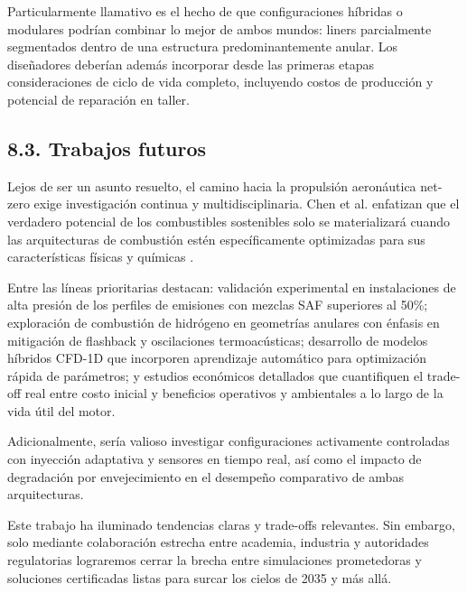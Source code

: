 Particularmente llamativo es el hecho de que configuraciones híbridas o modulares podrían combinar lo mejor de ambos mundos: liners parcialmente segmentados dentro de una estructura predominantemente anular. Los diseñadores deberían además incorporar desde las primeras etapas consideraciones de ciclo de vida completo, incluyendo costos de producción y potencial de reparación en taller.

\subsection{8.3. Trabajos futuros}

Lejos de ser un asunto resuelto, el camino hacia la propulsión aeronáutica net-zero exige investigación continua y multidisciplinaria. Chen et al. enfatizan que el verdadero potencial de los combustibles sostenibles solo se materializará cuando las arquitecturas de combustión estén específicamente optimizadas para sus características físicas y químicas \cite{Chen2025}.

Entre las líneas prioritarias destacan: validación experimental en instalaciones de alta presión de los perfiles de emisiones con mezclas SAF superiores al 50\%; exploración de combustión de hidrógeno en geometrías anulares con énfasis en mitigación de flashback y oscilaciones termoacústicas; desarrollo de modelos híbridos CFD-1D que incorporen aprendizaje automático para optimización rápida de parámetros; y estudios económicos detallados que cuantifiquen el trade-off real entre costo inicial y beneficios operativos y ambientales a lo largo de la vida útil del motor.

Adicionalmente, sería valioso investigar configuraciones activamente controladas con inyección adaptativa y sensores en tiempo real, así como el impacto de degradación por envejecimiento en el desempeño comparativo de ambas arquitecturas. 

Este trabajo ha iluminado tendencias claras y trade-offs relevantes. Sin embargo, solo mediante colaboración estrecha entre academia, industria y autoridades regulatorias lograremos cerrar la brecha entre simulaciones prometedoras y soluciones certificadas listas para surcar los cielos de 2035 y más allá.